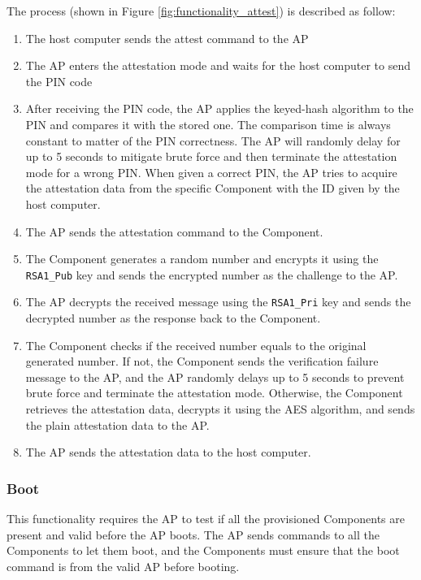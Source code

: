 \documentclass[11pt,oneside,onecolumn,letterpaper]{article}
\newcounter{alg}
\begin{document}
	The process (shown in Figure \ref{fig:functionality_attest}) is described as follow:
	\begin{enumerate}
		\item The host computer sends the attest command to the AP
		\item The AP enters the attestation mode and waits for the host computer to send the PIN code
		\item After receiving the PIN code,
		the AP applies the keyed-hash algorithm to the PIN and compares it with the stored one.
		The comparison time is always constant to matter of the PIN correctness.
		The AP will randomly delay for up to 5 seconds to mitigate brute force and then terminate the attestation mode for a wrong PIN.
		When given a correct PIN,
		the AP tries to acquire the attestation data from the specific Component with the ID given by the host computer.
		\item The AP sends the attestation command to the Component.
		\item The Component generates a random number and encrypts it using the \texttt{RSA1\_Pub} key and sends the encrypted number as the challenge to the AP.
		\item The AP decrypts the received message using the \texttt{RSA1\_Pri} key and sends the decrypted number as the response back to the Component.
		\item The Component checks if the received number equals to the original generated number.
		If not,
		the Component sends the verification failure message to the AP,
		and the AP randomly delays up to 5 seconds to prevent brute force and terminate the attestation mode.
		Otherwise,
		the Component retrieves the attestation data,
		decrypts it using the AES algorithm,
		and sends the plain attestation data to the AP.
		\item The AP sends the attestation data to the host computer.
	\end{enumerate}
	
	\subsubsection{Boot}
	This functionality requires the AP to test if all the provisioned Components are present and valid before the AP boots.
	The AP sends commands to all the Components to let them boot,
	and the Components must ensure that the boot command is from the valid AP before booting.
	
\end{document}
